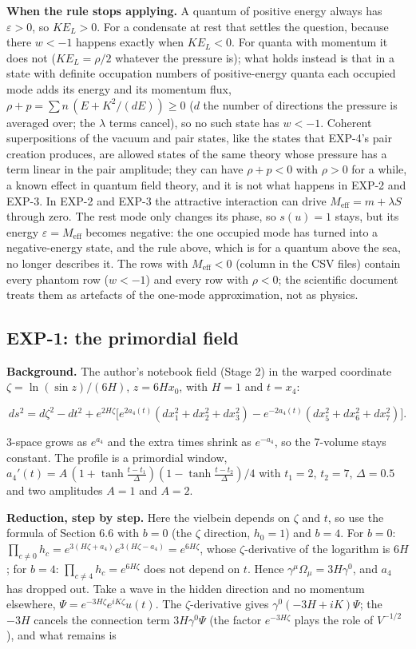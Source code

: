 \documentclass[11pt]{article}
\begin{document}
\textbf{When the rule stops applying.} A quantum of positive energy always has $\varepsilon>0$, so $KE_L>0$. For a condensate at rest that settles the question, because there $w<-1$ happens exactly when $KE_L<0$. For quanta with momentum it does not ($KE_L=\rho/2$ whatever the pressure is); what holds instead is that in a state with definite occupation numbers of positive-energy quanta each occupied mode adds its energy and its momentum flux, $\rho+p=\sum n\,(E+K^2/(dE))\ge0$ ($d$ the number of directions the pressure is averaged over; the $\lambda$ terms cancel), so no such state has $w<-1$. Coherent superpositions of the vacuum and pair states, like the states that EXP-4's pair creation produces, are allowed states of the same theory whose pressure has a term linear in the pair amplitude; they can have $\rho+p<0$ with $\rho>0$ for a while, a known effect in quantum field theory, and it is not what happens in EXP-2 and EXP-3. In EXP-2 and EXP-3 the attractive interaction can drive $M_{\mathrm{eff}}=m+\lambda S$ through zero. The rest mode only changes its phase, so $s(u)=1$ stays, but its energy $\varepsilon=M_{\mathrm{eff}}$ becomes negative: the one occupied mode has turned into a negative-energy state, and the rule above, which is for a quantum above the sea, no longer describes it. The rows with $M_{\mathrm{eff}}<0$ (column \texttt{} in the CSV files) contain every phantom row ($w<-1$) and every row with $\rho<0$; the scientific document treats them as artefacts of the one-mode approximation, not as physics.

\subsection{EXP-1: the primordial field}

\textbf{Background.} The author's notebook field (Stage 2) in the warped coordinate $\zeta=\ln(\sin z)/(6H)$, $z=6Hx_0$, with $H=1$ and $t=x_4$:

\[
ds^2=d\zeta^2-dt^2+e^{2H\zeta}\bigl[e^{2a_4(t)}(dx_1^2+dx_2^2+dx_3^2)-e^{-2a_4(t)}(dx_5^2+dx_6^2+dx_7^2)\bigr].
\]

3-space grows as $e^{a_4}$ and the extra times shrink as $e^{-a_4}$, so the 7-volume stays constant. The profile is a primordial window, $a_4'(t)=A\,(1+\tanh\frac{t-t_1}{\Delta})(1-\tanh\frac{t-t_2}{\Delta})/4$ with $t_1=2$, $t_2=7$, $\Delta=0.5$ and two amplitudes $A=1$ and $A=2$.

\textbf{Reduction, step by step.} Here the vielbein depends on $\zeta$ and $t$, so use the formula of Section 6.6 with $b=0$ (the $\zeta$ direction, $h_0=1$) and $b=4$. For $b=0$: $\prod_{c\ne0}h_c=e^{3(H\zeta+a_4)}e^{3(H\zeta-a_4)}=e^{6H\zeta}$, whose $\zeta$-derivative of the logarithm is $6H$; for $b=4$: $\prod_{c\ne4}h_c=e^{6H\zeta}$ does not depend on $t$. Hence $\gamma^\mu\Omega_\mu=3H\gamma^0$, and $a_4$ has dropped out. Take a wave in the hidden direction and no momentum elsewhere, $\Psi=e^{-3H\zeta}e^{iK\zeta}u(t)$. The $\zeta$-derivative gives $\gamma^0(-3H+iK)\Psi$; the $-3H$ cancels the connection term $3H\gamma^0\Psi$ (the factor $e^{-3H\zeta}$ plays the role of $V^{-1/2}$), and what remains is
\end{document}
